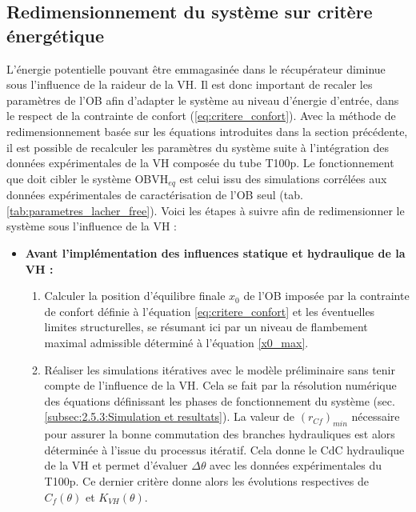 	\subsection{Redimensionnement du système sur critère énergétique}
	\label{subsec:6.1.2_Redimensionnement du systeme sur critere energetique}
L'énergie potentielle pouvant être emmagasinée dans le récupérateur diminue sous l'influence de la raideur de la VH. Il est donc important de recaler les paramètres de l'OB afin d'adapter le système au niveau d'énergie d'entrée, dans le respect de la contrainte de confort (\ref{eq:critere_confort}). Avec la méthode de redimensionnement basée sur les équations introduites dans la section précédente, il est possible de recalculer les paramètres du système suite à l'intégration des données expérimentales de la VH composée du tube T100p. Le fonctionnement que doit cibler le système OBVH$_{eq}$ est celui issu des simulations corrélées aux données expérimentales de caractérisation de l'OB seul (tab. \ref{tab:parametres_lacher_free}). Voici les étapes à suivre afin de redimensionner le système sous l'influence de la VH :
\begin{itemize}[label=$\circ$]
	\item \textbf{Avant l'implémentation des influences statique et hydraulique de la VH :}
	      \begin{enumerate}
		      \item Calculer la position d'équilibre finale $x_0$ de l'OB imposée par la contrainte de confort définie à l'équation \ref{eq:critere_confort} et les éventuelles limites structurelles, se résumant ici par un niveau de flambement maximal admissible déterminé à l'équation \ref{x0_max}.
		      \item Réaliser les simulations itératives avec le modèle préliminaire sans tenir compte de l'influence de la VH. Cela se fait par la résolution numérique des équations définissant les phases de fonctionnement du système (sec. \ref{subsec:2.5.3:Simulation et resultats}). La valeur de $(r_{Cf})_{min}$ nécessaire pour assurer la bonne commutation des branches hydrauliques est alors déterminée à l'issue du processus itératif. Cela donne le CdC hydraulique de la VH et permet d'évaluer $\Delta\theta$ avec les données expérimentales du T100p. Ce dernier critère donne alors les évolutions respectives de $C_f(\theta)$ et $K_{VH}(\theta)$.
	      \end{enumerate}
\end{itemize}
